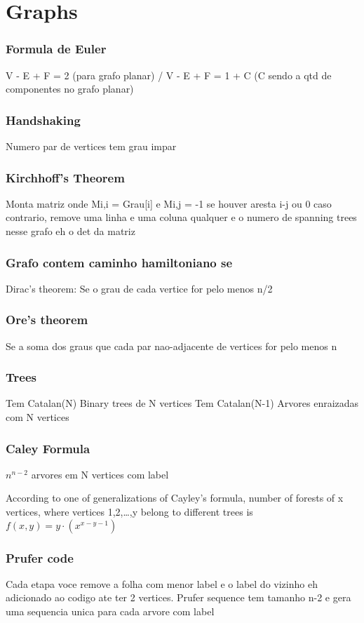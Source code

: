 \documentclass{article}
\begin{document}
\chapter{Graphs}


\subsection{Formula de Euler} V - E + F = 2 (para grafo planar) / V - E + F = 1 + C (C sendo a qtd de componentes no grafo planar)
\subsection{Handshaking} Numero par de vertices tem grau impar
\subsection{Kirchhoff's Theorem} Monta matriz onde Mi,i = Grau[i] e Mi,j = -1 se houver aresta i-j ou 0 caso contrario, remove uma linha e uma coluna qualquer e o numero de spanning trees nesse grafo eh o det da matriz

\subsection{Grafo contem caminho hamiltoniano se}
Dirac's theorem: Se o grau de cada vertice for pelo menos n/2
\subsection{Ore's theorem} Se a soma dos graus que cada par nao-adjacente de vertices for pelo menos n

\subsection{Trees}
Tem Catalan(N) Binary trees de N vertices
Tem Catalan(N-1) Arvores enraizadas com N vertices
\subsection{Caley Formula} 
$n^{n-2}$ arvores em N vertices com label

According to one of generalizations of Cayley's formula, number of forests of x vertices, where vertices 1,2,…,y belong to different trees is $f(x,y) = y\cdot (x^{x-y-1})$

\subsection{Prufer code} Cada etapa voce remove a folha com menor label e o label do vizinho eh adicionado ao codigo ate ter 2 vertices. Prufer sequence tem tamanho n-2 e gera uma sequencia unica para cada arvore com label
\end{document}
